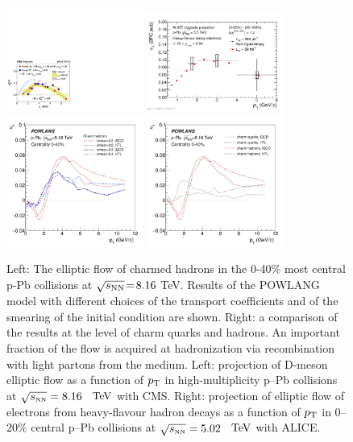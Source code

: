 \begin{figure}[ht]
\centering
\includegraphics[width=0.4\textwidth]{hf/figures/CMS_Dv2.pdf}
\includegraphics[width=0.4\textwidth]{hf/figures/2017-Oct-30-HFev2Plot.pdf}
\includegraphics[width=0.4\textwidth]{hf/figures/v2cD_pPb8TeV_smear.pdf}
\includegraphics[width=0.4\textwidth]{hf/figures/v2cD_pPb8TeV_HTLvslQCD.pdf}
\caption{
Left: The elliptic flow of charmed hadrons in the 0-40\% most central p-Pb collisions at $\sqrt{s_{\rm NN}}\!=\!8.16$ TeV. Results of the POWLANG model with different choices of the transport coefficients and of the smearing of the initial condition are shown. 
Right: a comparison of the results at the level of charm quarks and hadrons. An important fraction of the flow is acquired at hadronization via recombination with light partons from the medium.
Left: projection of D-meson elliptic flow as a function of $p_{\rm T}$ in high-multiplicity p--Pb collisions at $\sqrt{s_{\scriptscriptstyle \rm NN}}=8.16$~$~\text{TeV}$ with CMS.
Right: projection of elliptic flow of electrons from heavy-flavour hadron decays as a function of $p_{\rm T}$ in 0--20\% central p--Pb collisions at $\sqrt{s_{\scriptscriptstyle \rm NN}}=5.02$~$~\text{TeV}$ with ALICE.}
\label{fig:POWLANG-small2}
\end{figure}
